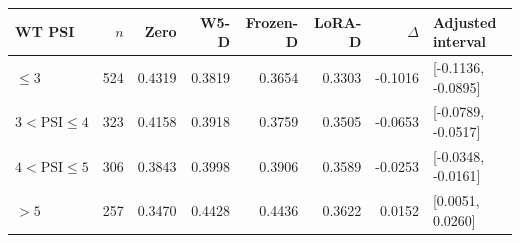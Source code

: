 
{\small\setlength{\tabcolsep}{4pt}
\begin{tabularx}{\textwidth}{lrrrrrrl}
\toprule
WT PSI & $n$ & Zero & W5-D & Frozen-D & LoRA-D & $\Delta$ & Adjusted interval \\
\midrule
$\le 3$ & 524 & 0.4319 & 0.3819 & 0.3654 & 0.3303 & -0.1016 & [-0.1136, -0.0895] \\
$3<\mathrm{PSI}\le4$ & 323 & 0.4158 & 0.3918 & 0.3759 & 0.3505 & -0.0653 & [-0.0789, -0.0517] \\
$4<\mathrm{PSI}\le5$ & 306 & 0.3843 & 0.3998 & 0.3906 & 0.3589 & -0.0253 & [-0.0348, -0.0161] \\
$>5$ & 257 & 0.3470 & 0.4428 & 0.4436 & 0.3622 & 0.0152 & [0.0051, 0.0260] \\
\bottomrule
\end{tabularx}}
